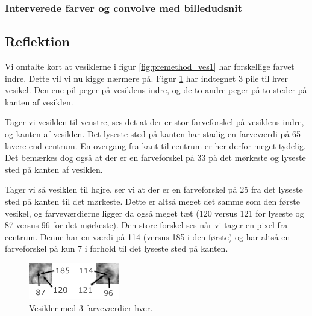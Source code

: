 \subsubsection{Interverede farver og convolve med billedudsnit} 

\subsection{Reflektion}
Vi omtalte kort at vesiklerne i figur \ref{fig:premethod_ves1} har forskellige farvet indre. Dette vil vi nu kigge nærmere på. Figur \ref{fig:premethod_vescolors} har indtegnet 3 pile til hver vesikel. Den ene pil peger på vesiklens indre, og de to andre peger på to steder på kanten af vesiklen. 

Tager vi vesiklen til venstre, ses det at der er stor farveforskel på vesiklens indre, og kanten af vesiklen. Det lyseste sted på kanten har stadig en farveværdi på 65 lavere end centrum. En overgang fra kant til centrum er her derfor meget tydelig. Det bemærkes dog også at der er en farveforskel på 33 på det mørkeste og lyseste sted på kanten af vesiklen. 

Tager vi så vesiklen til højre, ser vi at der er en farveforskel på 25 fra det lyseste sted på kanten til det mørkeste. Dette er altså meget det samme som den første vesikel, og farveværdierne ligger da også meget tæt (120 versus 121 for lyseste og 87 versus 96 for det mørkeste). Den store forskel ses når vi tager en pixel fra centrum. Denne har en værdi på 114 (versus 185 i den første) og har altså en farveforskel på kun 7 i forhold til det lyseste sted på kanten.

\begin{figure}[H]
	\centering
	\includegraphics[scale=5]{files/premethod/img/ves_colors.png}
	\caption{Vesikler med 3 farveværdier hver.\label{fig:premethod_vescolors}}
\end{figure}


